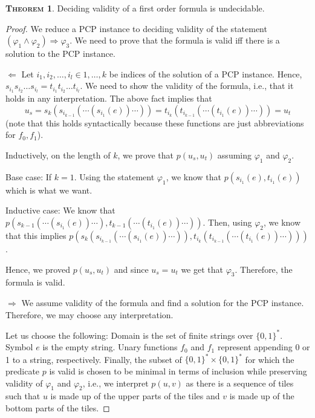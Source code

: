\documentclass{article}
\theoremstyle{definition}
\newtheorem{theorem}[definition]{\scshape Theorem}
\begin{document}
\begin{theorem}
    Deciding validity of a first order formula is undecidable.
\end{theorem}
\begin{proof}
    We reduce a PCP instance to deciding validity of the statement $(\varphi_1 \land \varphi_2) \Rightarrow \varphi_3$. We need to prove that the formula is valid iff there is a solution to the PCP instance.

    $\Leftarrow$
    Let $i_1, i_2, \ldots, i_l \in 1, \ldots, k$ be indices of the solution of a PCP instance. Hence, $s_{i_1}s_{i_2}\ldots s_{i_l} = t_{i_1}t_{i_2}\ldots t_{i_l}$. We need to show the validity of the formula, i.e., that it holds in any interpretation. The above fact implies that
    $$u_s = s_{k}(s_{i_{k-1}}(\cdots(s_{i_1}(e))\cdots)) = t_{i_k}(t_{i_{k-1}}(\cdots(t_{i_1}(e))\cdots)) = u_t$$
    (note that this holds syntactically because these functions are just abbreviations for $f_0, f_1$).
    
    Inductively, on the length of $k$, we prove that $p(u_s, u_t)$ assuming $\varphi_1$ and $\varphi_2$.

    Base case: If $k = 1$. Using the statement $\varphi_1$, we know that $p(s_{i_1}(e), t_{i_1}(e))$ which is what we want.
    
    Inductive case: We know that $p(s_{k-1}(\cdots(s_{i_1}(e))\cdots), t_{k-1}(\cdots(t_{i_1}(e))\cdots))$. Then, using $\varphi_2$, we know that this implies $p(s_{k}(s_{i_{k-1}}(\cdots(s_{i_1}(e))\cdots)), t_{i_k}(t_{i_{k-1}}(\cdots(t_{i_1}(e))\cdots)))$.
    
    Hence, we proved $p(u_s, u_t)$ and since $u_s = u_t$ we get that $\varphi_3$. Therefore, the formula is valid.

    $\Rightarrow$
    We assume validity of the formula and find a solution for the PCP instance. Therefore, we may choose any interpretation.
    
    Let us choose the following: Domain is the set of finite strings over $\{0, 1\}^*$. Symbol $e$ is the empty string. Unary functions $f_0$ and $f_1$ represent appending 0 or 1 to a string, respectively. Finally, the subset of $\{0, 1\}^* \times \{0, 1\}^*$ for which the predicate $p$ is valid is chosen to be minimal in terms of inclusion while preserving validity of $\varphi_1$ and $\varphi_2$, i.e., we interpret $p(u, v)$ as there is a sequence of tiles such that $u$ is made up of the upper parts of the tiles and $v$ is made up of the bottom parts of the tiles.
    

\end{proof}
\end{document}
